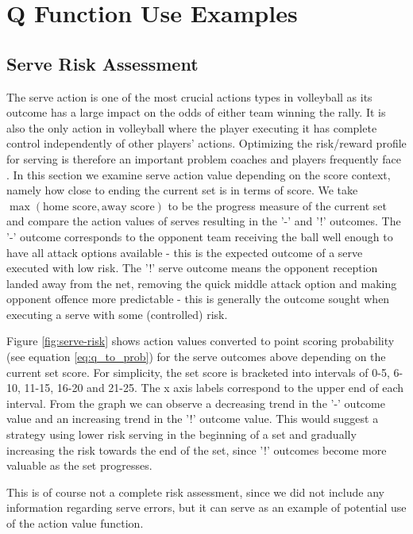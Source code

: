 \documentclass{sfuthesis}
\begin{document}
	\chapter{Q Function Use Examples}
	
	\section{Serve Risk Assessment}
	The serve action is one of the most crucial actions types in volleyball as its outcome has a large impact on the odds of either team winning the rally. It is also the only action in volleyball where the player executing it has complete control independently of other players' actions. Optimizing the risk/reward profile for serving is therefore an important problem coaches and players frequently face \cite{burton2015linear}. In this section we examine serve action value depending on the score context, namely how close to ending the current set is in terms of score. We take $\max(\text{home score}, \text{away score})$ to be the progress measure of the current set and compare the action values of serves resulting in the '-' and '!' outcomes. The '-' outcome corresponds to the opponent team receiving the ball well enough to have all attack options available - this is the expected outcome of a serve executed with low risk. The '!' serve outcome means the opponent reception landed away from the net, removing the quick middle attack option and making opponent offence more predictable - this is generally the outcome sought when executing a serve with some (controlled) risk.
	
	Figure \ref{fig:serve-risk} shows action values converted to point scoring probability (see equation \eqref{eq:q_to_prob}) for the serve outcomes above depending on the current set score. For simplicity, the set score is bracketed into intervals of 0-5, 6-10, 11-15, 16-20 and 21-25. The x axis labels correspond to the upper end of each interval. From the graph we can observe a decreasing trend in the '-' outcome value and an increasing trend in the '!' outcome value. This would suggest a strategy using lower risk serving in the beginning of a set and gradually increasing the risk towards the end of the set, since '!' outcomes become more valuable as the set progresses.
	
	This is of course not a complete risk assessment, since we did not include any information regarding serve errors, but it can serve as an example of potential use of the action value function.
	
\end{document}
